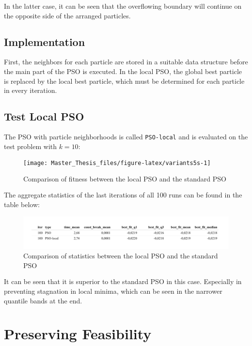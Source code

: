 \documentclass[
  oneside, a4paper, 12pt, openany]{book}
\theoremstyle{definition}
\theoremstyle{definition}
\theoremstyle{definition}
\theoremstyle{definition}
\theoremstyle{remark}
\begin{document}
In the latter case, it can be seen that the overflowing boundary will continue on the opposite side of the arranged particles.

\hypertarget{implementation-1}{%
\subsection{Implementation}\label{implementation-1}}

First, the neighbors for each particle are stored in a suitable data structure before the main part of the PSO is executed. In the local PSO, the global best particle is replaced by the local best particle, which must be determined for each particle in every iteration.

\hypertarget{test-local-pso}{%
\subsection{Test Local PSO}\label{test-local-pso}}

The PSO with particle neighborhoods is called \texttt{PSO-local} and is evaluated on the test problem with \(k=10\):

\begin{figure}[H]
\texttt{[image: Master\_Thesis\_files/figure-latex/variants5s-1]} \caption{Comparison of fitness between the local PSO and the standard PSO}\label{fig:variants5s}
\end{figure}

The aggregate statistics of the last iterations of all 100 runs can be found in the table below:

\begin{figure}[H]
\includegraphics{Master_Thesis_files/figure-latex/variants6-1} \caption{Comparison of statistics between the local PSO and the standard PSO}\label{fig:variants6}
\end{figure}

It can be seen that it is superior to the standard PSO in this case. Especially in preventing stagnation in local minima, which can be seen in the narrower quantile bands at the end.

\hypertarget{preserving-feasibility}{%
\section{Preserving Feasibility}\label{preserving-feasibility}}
\end{document}
